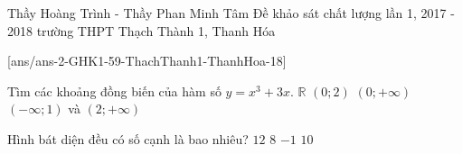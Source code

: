 
\begin{name}
{Thầy Hoàng Trình - Thầy Phan Minh Tâm}
{Đề khảo sát chất lượng lần 1, 2017 - 2018 trường THPT Thạch Thành 1, Thanh Hóa}
\end{name}
\setcounter{ex}{0}
[ans/ans-2-GHK1-59-ThachThanh1-ThanhHoa-18]
\begin{ex}%
Tìm các khoảng đồng biến của hàm số $y=x^3+3x$.
\choice
{\True $\mathbb{R}$}
{$(0;2)$}
{$(0;+\infty)$}
{$(-\infty;1)$ và $(2;+\infty)$}
\end{ex}
\begin{ex}%
Hình bát diện đều có số cạnh là bao nhiêu?
\choice
{\True $12$}
{$8$}
{$-1$}
{$10$}
\end{ex}

